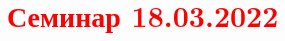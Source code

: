 \documentclass[main.tex]{subfiles}
\begin{document}
\section{\textcolor{red}{Семинар 18.03.2022}}
\end{document}
